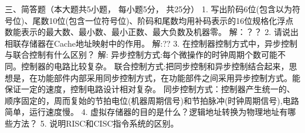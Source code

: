 三、简答题（本大题共5小题， 每小题5分， 共25分）
1. 写出阶码6位(包含以为符号位)、尾数10位(包含一位符号位)、阶码和尾数均用补码表示的16位规格化浮点数能表示的最大数、最小数、最小正数、最大负数及机器零。
解：？？
2. 请说出相联存储器在Cache地址映射中的作用。
解:??
3. 在控制器控制方式中，异步控制与联合控制有什么区别？
解:\newline
异步控制方式:每个微操作的时钟周期个数可能不同。控制器的电路比较复杂。\newline
联合控制方式:把同步控制和异步控制结合起来，思想是，在功能部件内部采用同步控制方式，在功能部件之间采用异步控制方式。能保证一定的速度，控制电路设计相对复杂。
同步控制方式：控制器产生统一的、顺序固定的，周而复始的节拍电位(机器周期信号)和节拍脉冲(时钟周期信号),电路简单，运行速度慢。
4. 虚拟存储器的目的是什么？逻辑地址转换为物理地址有哪些方法？
5. 说明RISC和CISC指令系统的区别。




















